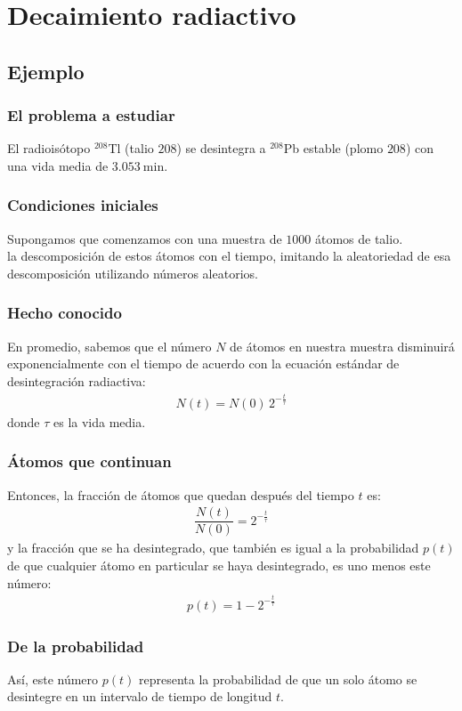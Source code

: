 \documentclass[12pt]{beamer}
\begin{document}
\section{Decaimiento radiactivo}
\subsection{Ejemplo}

\begin{frame}
\frametitle{El problema a estudiar}
El radioisótopo ${}^{208}$Tl (talio $208$) se desintegra a ${}^{208}$Pb estable (plomo $208$) con una vida media de $\SI{3.053}{\minute}$.
\end{frame}
\begin{frame}
\frametitle{Condiciones iniciales}
Supongamos que comenzamos con una muestra de $1000$ átomos de talio.
\\
\bigskip
\pause
{} la descomposición de estos átomos con el tiempo, imitando la aleatoriedad de esa descomposición utilizando números aleatorios.
\end{frame}
\begin{frame}
\frametitle{Hecho conocido}
En promedio, sabemos que el número $N$ de átomos en nuestra muestra disminuirá exponencialmente con el tiempo de acuerdo con la ecuación estándar de desintegración radiactiva:
\pause
\begin{align}
N (t) =  N (0) \, 2^{-\frac{t}{\tau}}
\label{eq:ecuacion_10_02}
\end{align}
donde $\tau$ es la vida media.
\end{frame}
\begin{frame}
\frametitle{Átomos que continuan}
Entonces, la fracción de átomos que quedan después del tiempo $t$ es:
\pause
\begin{align*}
\dfrac{N (t)}{N (0)} = 2^{-\frac{t}{\tau}}
\end{align*}
\pause
y la fracción que se ha desintegrado, que también es igual a la probabilidad $p (t)$ de que cualquier átomo en particular se haya desintegrado, es uno menos este número:
\pause
\begin{align}
p (t) = 1 - 2^{-\frac{t}{\tau}}
\label{eq:ecuacion_10_03}
\end{align}
\end{frame}
\begin{frame}
\frametitle{De la probabilidad}
Así, este número $p (t)$ representa la probabilidad de que un solo átomo se desintegre en un intervalo de tiempo de longitud $t$.
\end{frame}
\end{document}
